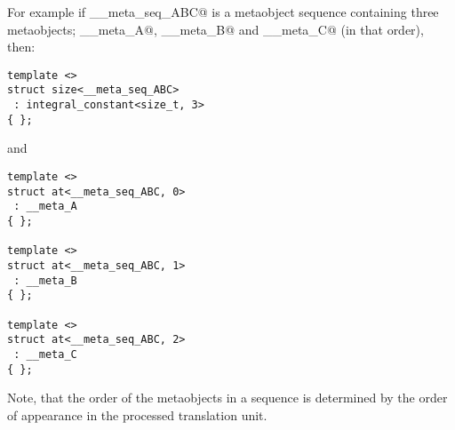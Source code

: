 For example if \verb@__meta_seq_ABC@ is a metaobject sequence containing three metaobjects;
\verb@__meta_A@, \verb@__meta_B@ and \verb@__meta_C@ (in that order), then:

\begin{verbatim}
template <>
struct size<__meta_seq_ABC>
 : integral_constant<size_t, 3>
{ };
\end{verbatim}

and 

\begin{verbatim}
template <>
struct at<__meta_seq_ABC, 0>
 : __meta_A
{ };

template <>
struct at<__meta_seq_ABC, 1>
 : __meta_B
{ };

template <>
struct at<__meta_seq_ABC, 2>
 : __meta_C
{ };
\end{verbatim}

Note, that the order of the metaobjects in a sequence is determined by the order
of appearance in the processed translation unit.
